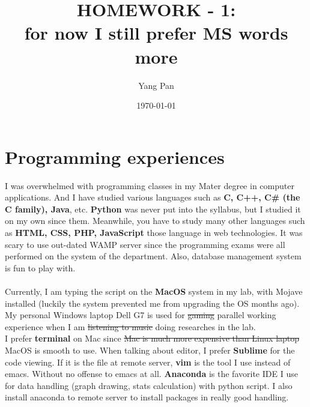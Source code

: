\documentclass[14pt, letterpaper]{article}
\begin{document}
\linespread{1.66667}

\title{HOMEWORK - 1: \\for now I still prefer MS words more}
\author{Yang Pan}
\date{\today}

\maketitle
\newpage


\tableofcontents
\newpage

\linenumbers

\section{Programming experiences}
I was overwhelmed with programming classes in my Mater degree in computer applications.
And I have studied various languages such as \textbf{C, C++, C\# (the C family), Java}, etc. \textbf{Python} was never put 
into the syllabus, but I studied it on my own since them. Meanwhile, you have to study many other languages 
such as \textbf{HTML, CSS, PHP, JavaScript} those language in web technologies. It was scary to use out-dated WAMP 
server since the programming exams were all performed on the system of the department. Also, database management 
system is fun to play with.
\\ \\
Currently, I am typing the script on the \textbf{MacOS} system in my lab, with Mojave installed (luckily the system prevented 
me from upgrading the OS months ago). My personal Windows laptop Dell G7 is used for \sout{gaming} parallel working experience 
when I am \sout{listening to music} doing researches in the lab. 
\\
I prefer \textbf{terminal} on Mac since \sout{Mac is much more expensive than Linux laptop} MacOS is smooth to use. 
When talking about editor, I prefer \textbf{Sublime} for the code viewing. If it is the file at remote server, \textbf{vim} is the 
tool I use instead of emacs. Without no offense to emacs at all. 
\textbf{Anaconda} is the favorite IDE I use for data handling (graph drawing, stats calculation) with python script. I also install 
anaconda to remote server to install packages in really good handling.
\end{document}
